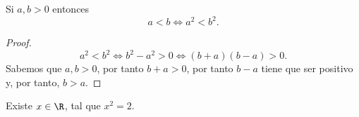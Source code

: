 \begin{flema}[]
\normalfont Si $\displaystyle a,b > 0 $ entonces
\[a < b \iff a^{2} < b^{2} .\]
\end{flema}

\begin{proof}
\[a^{2}<b^{2} \iff b^{2} - a^{2} > 0 \iff \left(b + a\right)\left(b - a\right) > 0 .\]
Sabemos que $\displaystyle a,b>0 $, por tanto $\displaystyle b + a > 0 $, por tanto $\displaystyle b - a $ tiene que ser positivo y, por tanto, $\displaystyle b > a $.
\end{proof}

\begin{ftheorem}[]
\normalfont Existe $\displaystyle x \in \R $, tal que $\displaystyle x^{2} = 2 $.
\end{ftheorem}

